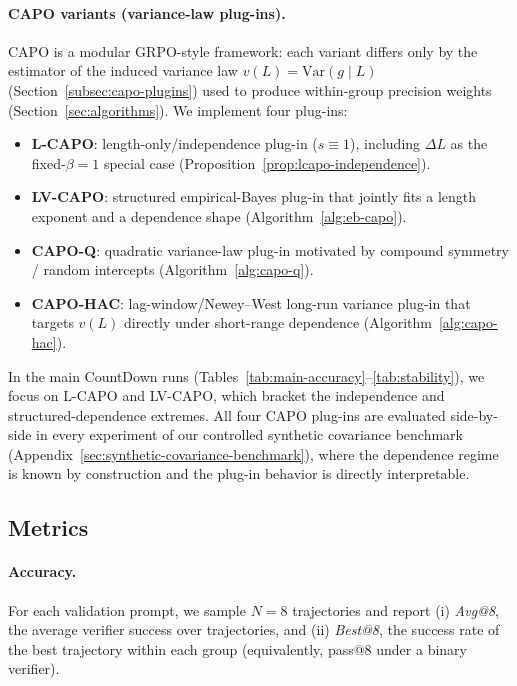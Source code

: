 \paragraph{CAPO variants (variance-law plug-ins).}
CAPO is a modular GRPO-style framework: each variant differs only by the estimator of the induced variance law $v(L)=\mathrm{Var}(g\mid L)$ (Section~\ref{subsec:capo-plugins}) used to produce within-group precision weights (Section~\ref{sec:algorithms}). We implement four plug-ins:
\begin{itemize}
  \item \textbf{L-CAPO}: length-only/independence plug-in ($s\equiv 1$), including $\Delta L$ as the fixed-$\beta{=}1$ special case (Proposition~\ref{prop:lcapo-independence}).
  \item \textbf{LV-CAPO}: structured empirical-Bayes plug-in that jointly fits a length exponent and a dependence shape (Algorithm~\ref{alg:eb-capo}).
  \item \textbf{CAPO-Q}: quadratic variance-law plug-in motivated by compound symmetry / random intercepts (Algorithm~\ref{alg:capo-q}).
  \item \textbf{CAPO-HAC}: lag-window/Newey--West long-run variance plug-in that targets $v(L)$ directly under short-range dependence (Algorithm~\ref{alg:capo-hac}).
\end{itemize}
In the main CountDown runs (Tables~\ref{tab:main-accuracy}--\ref{tab:stability}), we focus on L-CAPO and LV-CAPO, which bracket the independence and structured-dependence extremes. All four CAPO plug-ins are evaluated side-by-side in every experiment of our controlled synthetic covariance benchmark (Appendix~\ref{sec:synthetic-covariance-benchmark}), where the dependence regime is known by construction and the plug-in behavior is directly interpretable.

\subsection{Metrics}
\paragraph{Accuracy.} For each validation prompt, we sample $N=8$ trajectories
and report (i) \emph{Avg@8}, the average verifier success over trajectories, and
(ii) \emph{Best@8}, the success rate of the best trajectory within each group
(equivalently, pass@8 under a binary verifier).

